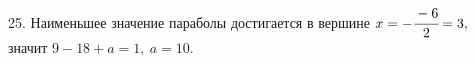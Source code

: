 25. Наименьшее значение параболы достигается в вершине $x=-\cfrac{-6}{2}=3,$ значит $9-18+a=1,\ a=10.$\\
